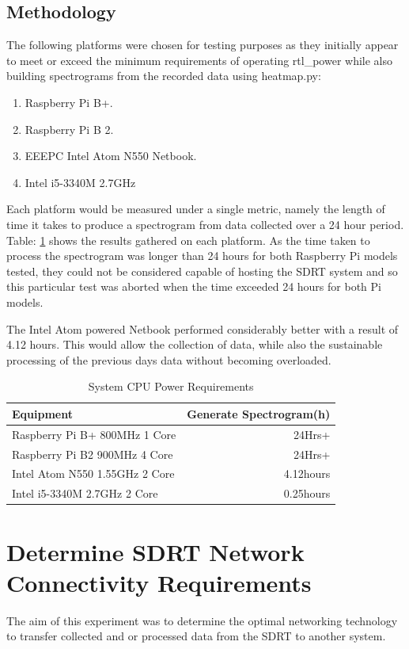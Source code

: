 \subsection*{Methodology}
The following platforms were chosen for testing purposes as they initially appear to meet or exceed the minimum requirements of operating rtl\_power while also building spectrograms from the recorded data using heatmap.py:

\begin{enumerate}
	\item Raspberry Pi B+.
	\item Raspberry Pi B 2. 
	\item EEEPC Intel Atom N550 Netbook.
	\item Intel i5-3340M 2.7GHz
\end{enumerate}

Each platform would be measured under a single metric, namely the length of time it takes to produce a spectrogram from data collected over a 24 hour period. Table: \ref{tab:system_cpu_power_requirements} shows the results gathered on each platform. As the time taken to process the spectrogram was longer than 24 hours for both Raspberry Pi models tested, they could not be considered capable of hosting the SDRT system and so this particular test was aborted when the time exceeded 24 hours for both Pi models. 

The Intel Atom powered Netbook performed considerably better with a result of 4.12 hours. This would allow the collection of data, while also the sustainable processing of the previous days data without becoming overloaded.

%
\begin{table}
	\centering
	\begin{tabular}{l r}
		\toprule
		Equipment & Generate Spectrogram(h) \\ \midrule
		Raspberry Pi B+ 800MHz 1 Core & 24Hrs+ \\
		Raspberry Pi B2 900MHz 4 Core & 24Hrs+ \\
		Intel Atom N550 1.55GHz 2 Core & 4.12hours \\
		Intel i5-3340M 2.7GHz 2 Core & 0.25hours \\
		\bottomrule
	\end{tabular}
	\caption{System CPU Power Requirements}
	\label{tab:system_cpu_power_requirements}
\end{table}
%


\newpage
\section*{Determine SDRT Network Connectivity Requirements}
The aim of this experiment was to determine the optimal networking technology to transfer collected and or processed data from the SDRT to another system.


